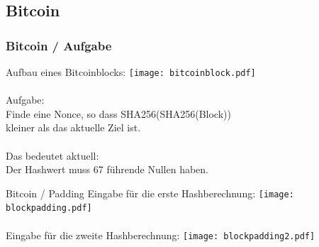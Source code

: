 \documentclass{beamer}
\begin{document}
  \subsection{Bitcoin}
    \begin{frame}
      \frametitle{Bitcoin / Aufgabe}
      Aufbau eines Bitcoinblocks:
      \texttt{[image: bitcoinblock.pdf]}\\
      ~\\
      Aufgabe:\\
      Finde eine Nonce, so dass SHA256(SHA256(Block))\\
      kleiner als das aktuelle Ziel ist.\\
      ~\\
      Das bedeutet aktuell:\\
      Der Hashwert muss 67 führende Nullen haben.
    \end{frame}
    \begin{frame}{Bitcoin / Padding}
      Eingabe für die erste Hashberechnung:
      \texttt{[image: blockpadding.pdf]}\\
      ~\\
      Eingabe für die zweite Hashberechnung:
      \texttt{[image: blockpadding2.pdf]}\\
  \end{frame}
\end{document}
